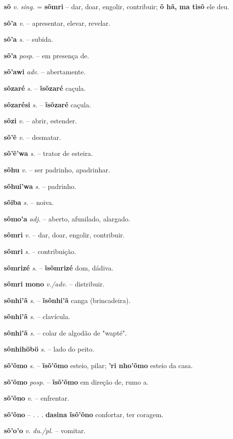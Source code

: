 \textbf{sõ} \textit{v. sing.} = \textbf{sõmri} -- dar, doar, engolir, contribuir; \textbf{õ hã, ma tisõ} ele deu.

\textbf{sõ'a} \textit{v.} -- apresentar, elevar, revelar.

\textbf{sõ'a} \textit{s.} -- subida.

\textbf{sõ'a} \textit{posp.} -- em presença de.

\textbf{sõ'awi} \textit{adv.} -- abertamente.

\textbf{sõzaré} \textit{s.} -- \textbf{ĩsõzaré} caçula.

\textbf{sõzarési} \textit{s.} -- \textbf{ĩsõzaré} caçula.

\textbf{sõzi} \textit{v.} -- abrir, estender.

\textbf{sõ'ẽ} \textit{v.} -- desmatar.

\textbf{sõ'ẽ'wa} \textit{s.} -- trator de esteira.

\textbf{sõhu} \textit{v.} -- ser padrinho, apadrinhar.

\textbf{sõhui'wa} \textit{s.} -- padrinho.

\textbf{sõiba} \textit{s.} -- noiva.

\textbf{sõmo'a} \textit{adj.} -- aberto, afunilado, alargado.

\textbf{sõmri} \textit{v.} -- dar, doar, engolir, contribuir.

\textbf{sõmri} \textit{s.} -- contribuição.

\textbf{sõmrizé} \textit{s.} -- \textbf{ĩsõmrizé} dom, dádiva.

\textbf{sõmri mono} \textit{v./adv.} -- distribuir.

\textbf{sõnhi'ã} \textit{s.} -- \textbf{ĩsõnhi'ã} canga (brincadeira).

\textbf{sõnhi'ã} \textit{s.} -- clavícula.

\textbf{sõnhi'ã} \textit{s.} -- colar de algodão de "wapté".

\textbf{sõnhihöbö} \textit{s.} -- lado do peito.

\textbf{sõ'õmo} \textit{s.} -- \textbf{ĩsõ'õmo} esteio, pilar; \textbf{'ri nho'õmo} esteio da casa.

\textbf{sõ'õmo} \textit{posp.} -- \textbf{ĩsõ'õmo} em direção de, rumo a.

\textbf{sõ'õno} \textit{v.} -- enfrentar.

\textbf{sõ'õno} \textit{} -- . . . \textbf{dasina ĩsõ'õno} confortar, ter coragem.

\textbf{sõ'o'o} \textit{v. du./pl.} -- vomitar.

